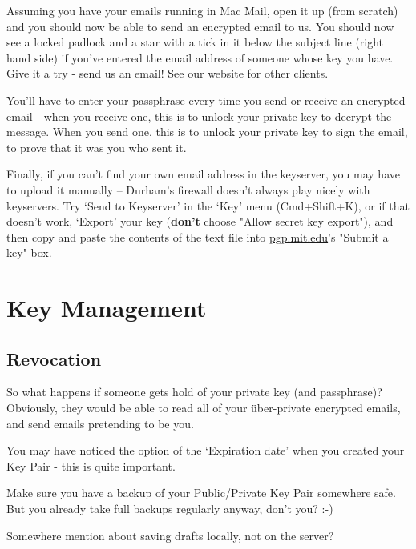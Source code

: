 \begin{compactenum}[1.]
  \item Assuming you have your emails running in Mac Mail, open it up (from scratch) and you should now be able to send an encrypted email to us. You should now see a locked padlock and a star with a tick in it below the subject line (right hand side) if you've entered the email address of someone whose key you have. Give it a try - send us an email! See our website for other clients.
  \item You'll have to enter your passphrase every time you send or receive an encrypted email - when you receive one, this is to unlock your private key to decrypt the message. When you send one, this is to unlock your private key to sign the email, to prove that it was you who sent it.
    \item Finally, if you can't find your own email address in the keyserver, you may have to upload it manually -- Durham's firewall doesn't always play nicely with keyservers. Try `Send to Keyserver' in the `Key' menu (Cmd+Shift+K), or if that doesn't work, `Export' your key (\textbf{don't} choose "Allow secret key export"), and then copy and paste the contents of the text file into \href{http://pgp.mit.edu}{pgp.mit.edu}'s "Submit a key" box.
\end{compactenum}%

\section{Key Management}

\subsection{Revocation}
So what happens if someone gets hold of your private key (and passphrase)? Obviously, they would be able to read all of your \"{u}ber-private encrypted emails, and send emails pretending to be you. 

You may have noticed the option of the `Expiration date' when you created your Key Pair - this is quite important.

Make sure you have a backup of your Public/Private Key Pair somewhere safe. But you already take full backups regularly anyway, don't you? :-)

Somewhere mention about saving drafts locally, not on the server?
















\loggingall

\endinput
